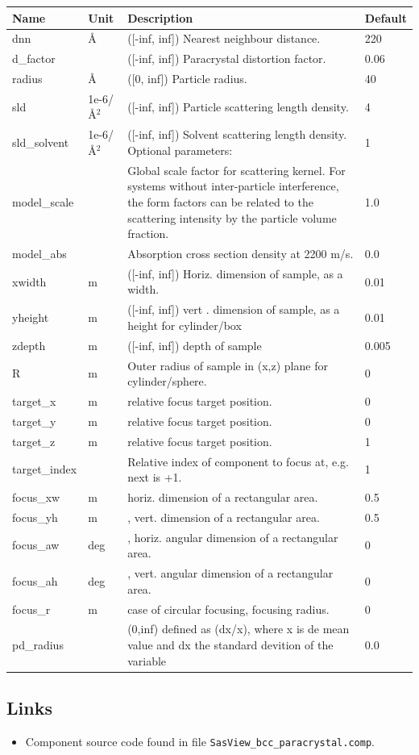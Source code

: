 \begin{longtable}{p{}p{}p{}p{}}
\toprule
\textbf{Name} & \textbf{Unit} & \textbf{Description} & \textbf{Default} \\
\midrule
\endhead
dnn & \AA{} & ([-inf, inf]) Nearest neighbour distance. & 220 \\
d\_factor &  & ([-inf, inf]) Paracrystal distortion factor. & 0.06 \\
radius & \AA{} & ([0, inf]) Particle radius. & 40 \\
sld & 1e-6/\AA{}$^{2}$ & ([-inf, inf]) Particle scattering length density. & 4 \\
sld\_solvent & 1e-6/\AA{}$^{2}$ & ([-inf, inf]) Solvent scattering length density. Optional parameters: & 1 \\
model\_scale &   & Global scale factor for scattering kernel. For systems without inter-particle interference, the form factors can be related to the scattering intensity by the particle volume fraction. & 1.0 \\
model\_abs &   & Absorption cross section density at 2200 m/s. & 0.0 \\
xwidth & m & ([-inf, inf]) Horiz. dimension of sample, as a width. & 0.01 \\
yheight & m & ([-inf, inf]) vert . dimension of sample, as a height for cylinder/box & 0.01 \\
zdepth & m & ([-inf, inf]) depth of sample & 0.005 \\
R & m & Outer radius of sample in (x,z) plane for cylinder/sphere. & 0 \\
target\_x & m & relative focus target position. & 0 \\
target\_y & m & relative focus target position. & 0 \\
target\_z & m & relative focus target position. & 1 \\
target\_index &   & Relative index of component to focus at, e.g. next is +1. & 1 \\
focus\_xw & m & horiz. dimension of a rectangular area. & 0.5 \\
focus\_yh & m & , vert. dimension of a rectangular area. & 0.5 \\
focus\_aw & deg & , horiz. angular dimension of a rectangular area. & 0 \\
focus\_ah & deg & , vert. angular dimension of a rectangular area. & 0 \\
focus\_r & m & case of circular focusing, focusing radius. & 0 \\
pd\_radius &  & (0,inf) defined as (dx/x), where x is de mean value and dx the standard devition of the variable & 0.0 \\
\bottomrule
\end{longtable}

\subsection*{Links}
\begin{itemize}
  \item Component source code found in file \texttt{SasView\_bcc\_paracrystal.comp}.
\end{itemize}
